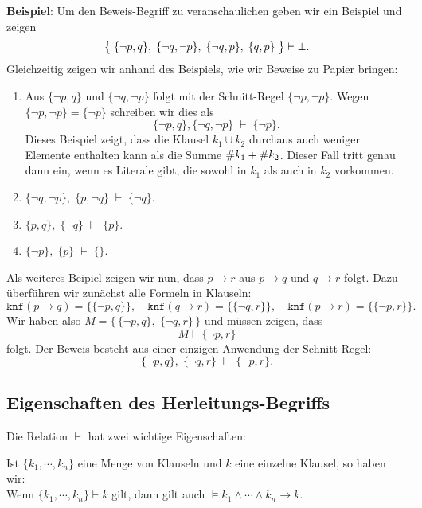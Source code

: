 \noindent
\textbf{Beispiel}:  Um den Beweis-Begriff zu veranschaulichen geben wir ein Beispiel und
zeigen 
\[ \bigl\{\; \{\neg p, q\},\; \{ \neg q, \neg p \},\; \{ \neg q, p \},\; \{ q, p \}\; \bigr\} \vdash \bot.
\]
Gleichzeitig zeigen wir anhand des Beispiels, wie wir Beweise zu Papier bringen:
\begin{enumerate}
\item Aus $\{\neg p, q \}$ und $\{ \neg q, \neg p \}$ folgt mit der Schnitt-Regel   
      $\{ \neg p, \neg p \}$.   Wegen $\{ \neg p, \neg p \} = \{ \neg p \}$
      schreiben wir dies als 
      \[ \{\neg p, q \}, \{ \neg q, \neg p \} \;\vdash\; \{ \neg p \}. \]
      Dieses Beispiel zeigt, dass die Klausel $k_1 \cup k_2$ durchaus auch weniger
      Elemente enthalten kann als die Summe $\symbol{35}k_1 + \symbol{35}k_2$.  Dieser
      Fall tritt genau dann ein, wenn es Literale gibt, die sowohl in $k_1$ als auch in
      $k_2$ vorkommen.
\item $\{\neg q, \neg p \},\; \{ p, \neg q \} \;\vdash\; \{ \neg q \}$. 
\item $\{ p, q \},\; \{ \neg q \} \;\vdash\; \{ p \}$. 
\item $\{ \neg p \},\; \{ p \} \;\vdash\; \{\}$. 
\end{enumerate}
Als weiteres Beipiel zeigen wir nun, dass $p \rightarrow r$ aus $p \rightarrow q$ und $q \rightarrow r$ 
folgt.  Dazu \"{u}berf\"{u}hren wir zun\"{a}chst alle Formeln in Klauseln: 
\[ \mathtt{knf}(p \rightarrow q) = \bigl\{ \{ \neg p, q \} \bigr\}, \quad
   \mathtt{knf}(q \rightarrow r) = \bigl\{ \{ \neg q, r \} \bigr\}, \quad 
   \mathtt{knf}(p \rightarrow r) = \bigl\{ \{ \neg p, r \} \bigr\}.
\]
Wir haben also $M = \bigl\{\, \{ \neg p, q \},\; \{ \neg q, r \}\,\bigr\}$ und m\"{u}ssen zeigen, dass
\[ M \vdash  \{ \neg p, r \} \]
folgt.  Der Beweis besteht aus einer einzigen Anwendung der Schnitt-Regel: 
\[ \{ \neg p, q \},\; \{ \neg q, r \} \;\vdash\; \{ \neg p, r \}. \]

\subsection{Eigenschaften des Herleitungs-Begriffs}
Die Relation $\vdash$ hat zwei wichtige Eigenschaften:

\begin{Satz}[Korrektheit]
  Ist $\{k_1, \cdots, k_n \}$ eine Menge von Klauseln und $k$ eine einzelne Klausel,
  so haben wir: \\[0.2cm]
  \hspace*{3.3cm} Wenn $\{k_1, \cdots, k_n \} \vdash k$ gilt, \quad dann gilt auch $\models k_1 \wedge \cdots \wedge k_n \rightarrow k$.  
\end{Satz}

